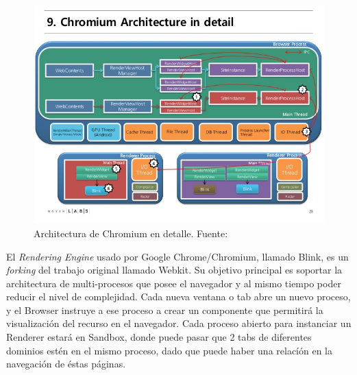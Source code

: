     \begin{figure}[h!t]
        \centering
        \includegraphics[scale=0.5]{figures/chromium-rendering-pipeline-28-638.jpg}
        \caption{Architectura de Chromium en detalle. Fuente: \cite{ChrRenderPipe}}
        \label{fig:archGC2}
    \end{figure}

    El \textit{Rendering Engine} usado por Google Chrome/Chromium, llamado Blink, es un \textit{forking} del trabajo original llamado Webkit. Su objetivo principal es soportar la architectura de multi-procesos que posee el navegador y al mismo tiempo poder reducir el nivel de complejidad. Cada nueva ventana o tab abre un nuevo proceso, y el Browser instruye a ese proceso a crear un componente que permitirá la visualización del recurso en el navegador. Cada proceso abierto para instanciar un Renderer estará en Sandbox, donde puede pasar que 2 tabs de diferentes dominios estén en el mismo proceso, dado que puede haber una relacíón en la navegación de éstas páginas.



